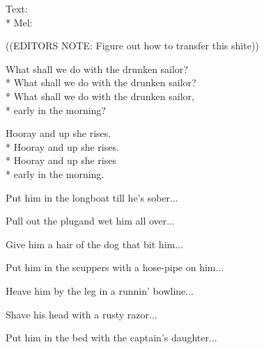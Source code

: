 \begin{SongText}[Sailing]
    \begin{SongInfo}
        Text:\\*%
        Mel:
    \end{SongInfo}
    \begin{SongVerse}
        ((EDITORS NOTE: Figure out how to transfer this shite))
    \end{SongVerse}
\end{SongText}
\begin{SongText}
    \begin{SongVerse}
        What shall we do with the drunken sailor?\\*%
        What shall we do with the drunken sailor?\\*%
        What shall we do with the drunken sailor,\\*%
        early in the morning?
    \end{SongVerse}
    \begin{SongVerse}
        Hooray and up she rises.\\*%
        Hooray and up she rises.\\*%
        Hooray and up she rises\\*%
        early in the morning.
    \end{SongVerse}
    \begin{SongVerse}
        Put him in the longboat till he's sober...
    \end{SongVerse}
    \begin{SongVerse}
        Pull out the plugand wet him all over...
    \end{SongVerse}
    \begin{SongVerse}
        Give him a hair of the dog that bit him...
    \end{SongVerse}
    \begin{SongVerse}
        Put him in the scuppers with a hose-pipe on him...
    \end{SongVerse}
    \begin{SongVerse}
        Heave him by the leg in a runnin' bowline...
    \end{SongVerse}
    \begin{SongVerse}
        Shave his head with a rusty razor...
    \end{SongVerse}
    \begin{SongVerse}
        Put him in the bed with the captain's daughter...
    \end{SongVerse}

\end{SongText}
